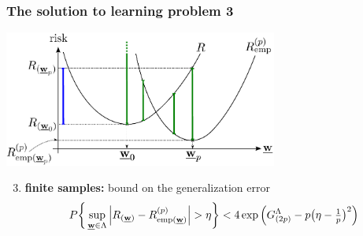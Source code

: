 \begin{frame}\frametitle{The solution to learning problem 3} 
	\begin{center}
		\includegraphics[width=9cm]{img/section2_fig1_question2_lessw}
	\end{center}
	\begin{enumerate}\setcounter{enumi}{2}
		\item \textbf{finite samples:} bound on the generalization error
			\vspace{-2mm}
			\begin{equation}
				P\bigg\{ \sup\limits_{\vec w \in \Lambda}
					{%
						\Big|R_{(\vec w)} - R^{(p)}_{\text{emp}(\vec w)}\Big| 
					} > \eta
				\bigg\} < 4 \exp\Big( G^\Lambda_{(2p)} 
					- p \big( \eta - \smallfrac{1}{p} \big)^2 \Big)
					\label{eq:boundgenerlization}
			\end{equation}
			\vspace{-4mm}
	\end{enumerate}
\end{frame}
